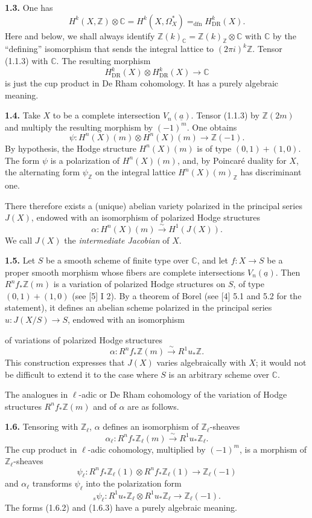 \documentclass[10pt]{article}
\newcommand{\C}{\mathbb C}
\newcommand{\Z}{\mathbb Z}
\newcommand{\DR}{\mathrm{DR}}
\newcommand{\iso}{\xrightarrow{\sim}}
\newcommand{\dfneq}{\mathrel{=_{\mathrm{dfn}}}}
\newcommand{\sourcebreak}{\clearpage}
\begin{document}
\noindent\textbf{1.3.} One has
\[
\tag{1.3.1}
H^k(X,\Z)\otimes\C=H^k(X,\Omega_X^*)\dfneq H^k_{\DR}(X).
\]
Here and below, we shall always identify \(\Z(k)_\C=\Z(k)_\Z\otimes\C\) with \(\C\) by the ``defining'' isomorphism that sends the integral lattice to \((2\pi i)^k\Z\). Tensor (1.1.3) with \(\C\). The resulting morphism
\[
\tag{1.3.2}
H^k_{\DR}(X)\otimes H^k_{\DR}(X)\longrightarrow\C
\]
is just the cup product in De Rham cohomology. It has a purely algebraic meaning.

\noindent\textbf{1.4.} Take \(X\) to be a complete intersection \(V_n(\underline a)\). Tensor (1.1.3) by \(\Z(2m)\) and multiply the resulting morphism by \((-1)^m\). One obtains
\[
\tag{1.4.1}
\psi:H^n(X)(m)\otimes H^n(X)(m)\longrightarrow\Z(-1).
\]
By hypothesis, the Hodge structure \(H^n(X)(m)\) is of type \((0,1)+(1,0)\). The form \(\psi\) is a polarization of \(H^n(X)(m)\), and, by Poincaré duality for \(X\), the alternating form \(\psi_\Z\) on the integral lattice \(H^n(X)(m)_\Z\) has discriminant one.

There therefore exists a (unique) abelian variety polarized in the principal series \(J(X)\), endowed with an isomorphism of polarized Hodge structures
\[
\alpha:H^n(X)(m)\iso H^1(J(X)).
\]
We call \(J(X)\) the \emph{intermediate Jacobian} of \(X\).

\noindent\textbf{1.5.} Let \(S\) be a smooth scheme of finite type over \(\C\), and let \(f:X\to S\) be a proper smooth morphism whose fibers are complete intersections \(V_n(\underline a)\). Then \(R^nf_*\Z(m)\) is a variation of polarized Hodge structures on \(S\), of type \((0,1)+(1,0)\) (see [5] I 2). By a theorem of Borel (see [4] 5.1 and 5.2 for the statement), it defines an abelian scheme polarized in the principal series \(u:J(X/S)\to S\), endowed with an isomorphism

\sourcebreak
of variations of polarized Hodge structures
\[
\alpha:R^nf_*\Z(m)\iso R^1u_*\Z.
\]
This construction expresses that \(J(X)\) varies algebraically with \(X\); it would not be difficult to extend it to the case where \(S\) is an arbitrary scheme over \(\C\).

The analogues in \(\ell\)-adic or De Rham cohomology of the variation of Hodge structures \(R^nf_*\Z(m)\) and of \(\alpha\) are as follows.

\noindent\textbf{1.6.} Tensoring with \(\Z_\ell\), \(\alpha\) defines an isomorphism of \(\Z_\ell\)-sheaves
\[
\tag{1.6.1}
\alpha_\ell:R^nf_*\Z_\ell(m)\iso R^1u_*\Z_\ell.
\]
The cup product in \(\ell\)-adic cohomology, multiplied by \((-1)^m\), is a morphism of \(\Z_\ell\)-sheaves
\[
\tag{1.6.2}
\psi_\ell:R^nf_*\Z_\ell(1)\otimes R^nf_*\Z_\ell(1)\longrightarrow\Z_\ell(-1)
\]
and \(\alpha_\ell\) transforms \(\psi_\ell\) into the polarization form
\[
\tag{1.6.3}
{}_s\psi_\ell:R^1u_*\Z_\ell\otimes R^1u_*\Z_\ell\longrightarrow\Z_\ell(-1).
\]
The forms (1.6.2) and (1.6.3) have a purely algebraic meaning.
\end{document}
